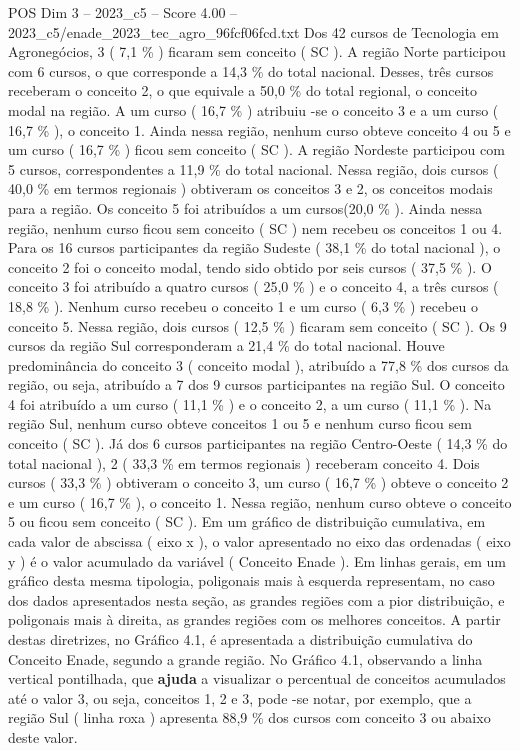 \begin{textsample}{POS Dim 3 – 2023\_c5 – Score 4.00 – 2023\_c5/enade\_2023\_tec\_agro\_96fcf06fcd.txt}
Dos 42 cursos de Tecnologia em Agronegócios, 3 ( 7,1 \% ) ficaram sem conceito ( SC ).
A região Norte participou com 6 cursos, o que corresponde a 14,3 \% do total nacional.
Desses, três cursos receberam o conceito 2, o que equivale a 50,0 \% do total regional, o conceito modal na região.
A um curso ( 16,7 \% ) atribuiu -se o conceito 3 e a um curso ( 16,7 \% ), o conceito 1.
Ainda nessa região, nenhum curso obteve conceito 4 ou 5 e um curso ( 16,7 \% ) ficou sem conceito ( SC ).
A região Nordeste participou com 5 cursos, correspondentes a 11,9 \% do total nacional.
Nessa região, dois cursos ( 40,0 \% em termos regionais ) obtiveram os conceitos 3 e 2, os conceitos modais para a região.
Os conceito 5 foi atribuídos a um cursos(20,0 \% ).
Ainda nessa região, nenhum curso ficou sem conceito ( SC ) nem recebeu os conceitos 1 ou 4.
Para os 16 cursos participantes da região Sudeste ( 38,1 \% do total nacional ), o conceito 2 foi o conceito modal, tendo sido obtido por seis cursos ( 37,5 \% ).
O conceito 3 foi atribuído a quatro cursos ( 25,0 \% ) e o conceito 4, a três cursos ( 18,8 \% ).
Nenhum curso recebeu o conceito 1 e um curso ( 6,3 \% ) recebeu o conceito 5.
Nessa região, dois cursos ( 12,5 \% ) ficaram sem conceito ( SC ).
Os 9 cursos da região Sul corresponderam a 21,4 \% do total nacional.
Houve predominância do conceito 3 ( conceito modal ), atribuído a 77,8 \% dos cursos da região, ou seja, atribuído a 7 dos 9 cursos participantes na região Sul.
O conceito 4 foi atribuído a um curso ( 11,1 \% ) e o conceito 2, a um curso ( 11,1 \% ).
Na região Sul, nenhum curso obteve conceitos 1 ou 5 e nenhum curso ficou sem conceito ( SC ).
Já dos 6 cursos participantes na região Centro-Oeste ( 14,3 \% do total nacional ), 2 ( 33,3 \% em termos regionais ) receberam conceito 4.
Dois cursos ( 33,3 \% ) obtiveram o conceito 3, um curso ( 16,7 \% ) obteve o conceito 2 e um curso ( 16,7 \% ), o conceito 1.
Nessa região, nenhum curso obteve o conceito 5 ou ficou sem conceito ( SC ).
Em um gráfico de distribuição cumulativa, em cada valor de abscissa ( eixo x ), o valor apresentado no eixo das ordenadas ( eixo y ) é o valor acumulado da variável ( Conceito Enade ).
Em linhas gerais, em um gráfico desta mesma tipologia, poligonais mais à esquerda representam, no caso dos dados apresentados nesta seção, as grandes regiões com a pior distribuição, e poligonais mais à direita, as grandes regiões com os melhores conceitos.
A partir destas diretrizes, no Gráfico 4.1, é apresentada a distribuição cumulativa do Conceito Enade, segundo a grande região.
No Gráfico 4.1, observando a linha vertical pontilhada, que \textbf{ajuda} a visualizar o percentual de conceitos acumulados até o valor 3, ou seja, conceitos 1, 2 e 3, pode -se notar, por exemplo, que a região Sul ( linha roxa ) apresenta 88,9 \% dos cursos com conceito 3 ou abaixo deste valor.

\end{textsample}
